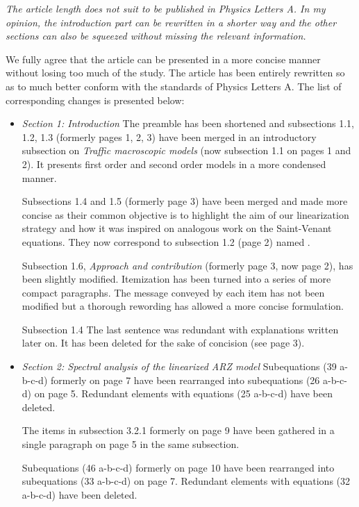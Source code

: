 \documentclass{article}
\begin{document}
\bigskip{}

\emph{
The article length does not suit to be published in Physics Letters A. In my opinion, the introduction part can be rewritten in a shorter way and the other sections can also be squeezed without missing the relevant information.
}

We fully agree that the article can be presented in a more concise manner without losing too much of the study. The article has been entirely rewritten so as to much better conform with the standards of Physics Letters A. The list of corresponding changes is presented below:
\begin{itemize}
\item
\emph{Section 1: Introduction}
The preamble has been shortened and subsections 1.1, 1.2, 1.3 (formerly pages 1, 2, 3) have been merged in an introductory subsection on \textit{Traffic macroscopic models} (now subsection 1.1 on pages 1 and 2). It presents first order and second order models in a more condensed manner.

Subsections 1.4 and 1.5 (formerly page 3) have been merged and made more concise as their common objective is to highlight the aim of our linearization strategy and how it was inspired on analogous work on the Saint-Venant equations. They now correspond to subsection 1.2 (page 2) named .

Subsection 1.6, \textit{Approach and contribution} (formerly page 3, now page 2), has been slightly modified. Itemization has been turned into a series of more compact paragraphs. The message conveyed by each item has not been modified but a thorough rewording has allowed a more concise formulation.

Subsection 1.4 The last sentence was redundant with explanations written later on. It has been deleted for the sake of concision (see page 3).

\item
\emph{Section 2: Spectral analysis of the linearized ARZ model}
Subequations (39 a-b-c-d) formerly on page 7 have been rearranged into subequations (26 a-b-c-d) on page 5. Redundant elements with equations (25 a-b-c-d) have been deleted.

The items in subsection 3.2.1 formerly on page 9 have been gathered in a single paragraph on page 5 in the same subsection. 

Subequations (46 a-b-c-d) formerly on page 10 have been rearranged into subequations (33 a-b-c-d)  on page 7. Redundant elements with equations (32 a-b-c-d) have been deleted.


\end{itemize}
\end{document}
